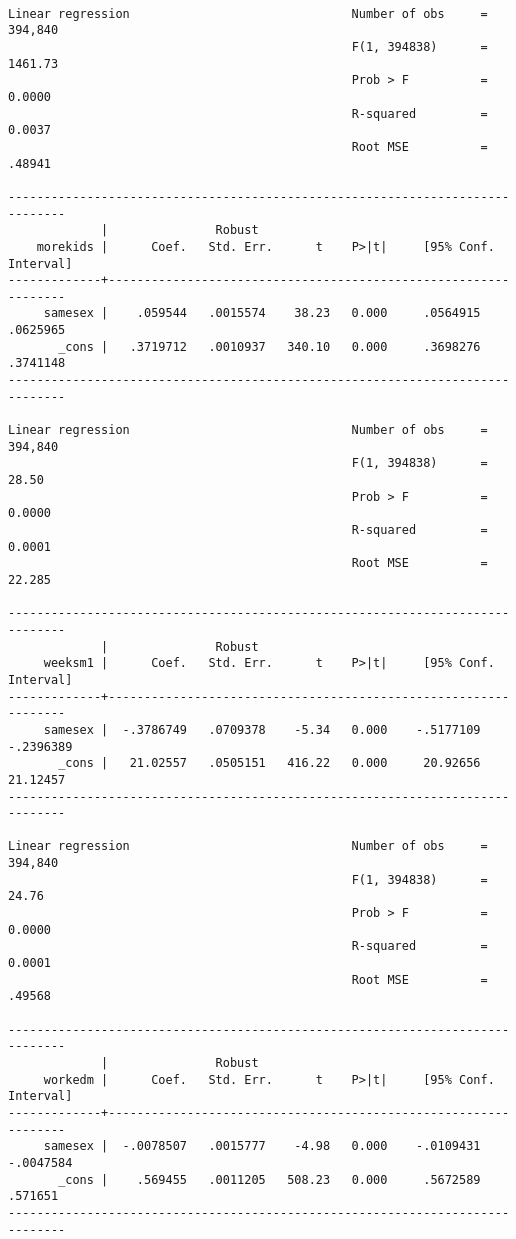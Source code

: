 \documentclass[cache=false]{article}
\begin{document}
\begin{verbatim}

Linear regression                               Number of obs     =    394,840
                                                F(1, 394838)      =    1461.73
                                                Prob > F          =     0.0000
                                                R-squared         =     0.0037
                                                Root MSE          =     .48941

------------------------------------------------------------------------------
             |               Robust
    morekids |      Coef.   Std. Err.      t    P>|t|     [95% Conf. Interval]
-------------+----------------------------------------------------------------
     samesex |    .059544   .0015574    38.23   0.000     .0564915    .0625965
       _cons |   .3719712   .0010937   340.10   0.000     .3698276    .3741148
------------------------------------------------------------------------------

Linear regression                               Number of obs     =    394,840
                                                F(1, 394838)      =      28.50
                                                Prob > F          =     0.0000
                                                R-squared         =     0.0001
                                                Root MSE          =     22.285

------------------------------------------------------------------------------
             |               Robust
     weeksm1 |      Coef.   Std. Err.      t    P>|t|     [95% Conf. Interval]
-------------+----------------------------------------------------------------
     samesex |  -.3786749   .0709378    -5.34   0.000    -.5177109   -.2396389
       _cons |   21.02557   .0505151   416.22   0.000     20.92656    21.12457
------------------------------------------------------------------------------

Linear regression                               Number of obs     =    394,840
                                                F(1, 394838)      =      24.76
                                                Prob > F          =     0.0000
                                                R-squared         =     0.0001
                                                Root MSE          =     .49568

------------------------------------------------------------------------------
             |               Robust
     workedm |      Coef.   Std. Err.      t    P>|t|     [95% Conf. Interval]
-------------+----------------------------------------------------------------
     samesex |  -.0078507   .0015777    -4.98   0.000    -.0109431   -.0047584
       _cons |    .569455   .0011205   508.23   0.000     .5672589     .571651
------------------------------------------------------------------------------
\end{verbatim}
\end{document}
